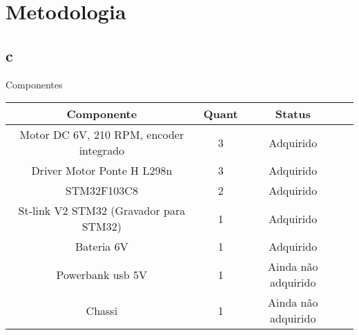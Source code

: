

\chapter{Metodologia}

\section{c}

\begin{quadro}[htb]
\caption{\label{lista de componentes}Componentes}
 \begin{tabular}{|c|c|c|c|}
	\hline
	\textbf{Componente} & \textbf{Quant} & \textbf{Status} \\ \hline
	Motor DC 6V,  210 RPM, encoder integrado & 3 & Adquirido  \\ \hline
	Driver Motor Ponte H L298n  & 3 & Adquirido  \\ \hline
	STM32F103C8 & 2 & Adquirido   \\ \hline
	St-link V2 STM32 (Gravador para STM32) & 1 & Adquirido   \\ \hline
	Bateria 6V & 1  & Adquirido    \\ \hline
	Powerbank usb 5V & 1 & Ainda não adquirido  \\ \hline
	Chassi & 1 & Ainda não adquirido  \\ \hline
\end{tabular}
\end{quadro}
